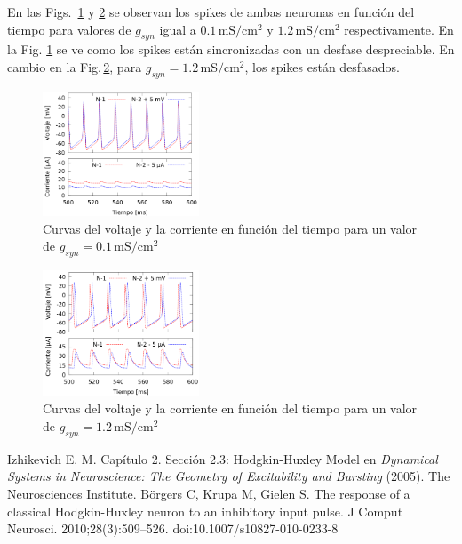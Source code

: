     En las Figs.\, \ref{fig:gsyn0-1} y \ref{fig:gsyn1-2} se observan los spikes de ambas neuronas en función del tiempo para valores de $g_{syn}$ igual a $0.1\,\text{mS}/\text{cm}^2$ y $1.2\,\text{mS}/\text{cm}^2$ respectivamente. En la Fig. \ref{fig:gsyn0-1} se ve como los spikes están sincronizadas con un desfase despreciable. %
    En cambio en la Fig.\,\ref{fig:gsyn1-2}, para $g_{syn}=1.2\,\text{mS}/\text{cm}^2$, los spikes están desfasados. 

     \begin{figure}[H]
        \centering
        \includegraphics[width=0.415\textwidth]{current_15_in_gsyn_0-1.png}
        \caption{Curvas del voltaje y la corriente en función del tiempo para un valor de $g_{syn}=0.1\,\text{mS}/\text{cm}^2$}
        \label{fig:gsyn0-1}
    \end{figure}

        \begin{figure}[H]
        \centering
        \includegraphics[width=0.415\textwidth]{current_15_in_gsyn_1-2.png}
        \caption{Curvas del voltaje y la corriente en función del tiempo para un valor de $g_{syn}=1.2\,\text{mS}/\text{cm}^2$}
        \label{fig:gsyn1-2}
    \end{figure}



\begin{thebibliography}{50}
{} Izhikevich E. M. Capítulo 2. Sección 2.3: Hodgkin-Huxley Model en {\sl Dynamical Systems in Neuroscience: The Geometry of Excitability and Bursting} (2005).  The Neurosciences Institute.
 Börgers C, Krupa M, Gielen S. The response of a classical Hodgkin-Huxley neuron to an inhibitory input pulse. J Comput Neurosci. 2010;28(3):509–526. doi:10.1007/s10827-010-0233-8
\end{thebibliography}

